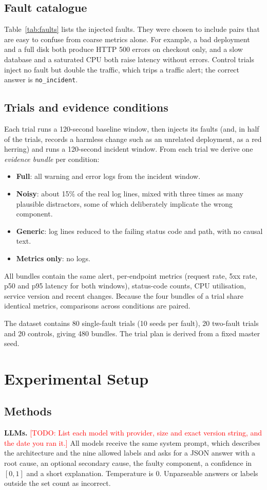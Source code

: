 \documentclass[conference]{IEEEtran}
\newcommand{\TODO}[1]{\textcolor{red}{[TODO: #1]}}
\begin{document}
\subsection{Fault catalogue}
Table~\ref{tab:faults} lists the injected faults. They were chosen to include pairs that are easy to confuse from coarse metrics alone. For example, a bad deployment and a full disk both produce HTTP 500 errors on checkout only, and a slow database and a saturated CPU both raise latency without errors. Control trials inject no fault but double the traffic, which trips a traffic alert; the correct answer is \texttt{no\_incident}.

\subsection{Trials and evidence conditions}
Each trial runs a 120-second baseline window, then injects its faults (and, in half of the trials, records a harmless change such as an unrelated deployment, as a red herring) and runs a 120-second incident window. From each trial we derive one \emph{evidence bundle} per condition:
\begin{itemize}
  \item \textbf{Full}: all warning and error logs from the incident window.
  \item \textbf{Noisy}: about 15\% of the real log lines, mixed with three times as many plausible distractors, some of which deliberately implicate the wrong component.
  \item \textbf{Generic}: log lines reduced to the failing status code and path, with no causal text.
  \item \textbf{Metrics only}: no logs.
\end{itemize}
All bundles contain the same alert, per-endpoint metrics (request rate, 5xx rate, p50 and p95 latency for both windows), status-code counts, CPU utilisation, service version and recent changes. Because the four bundles of a trial share identical metrics, comparisons across conditions are paired.

The dataset contains 80 single-fault trials (10 seeds per fault), 20 two-fault trials and 20 controls, giving 480 bundles. The trial plan is derived from a fixed master seed.

\section{Experimental Setup}
\label{sec:setup}
\subsection{Methods}
\textbf{LLMs.} \TODO{List each model with provider, size and exact version string, and the date you ran it.} All models receive the same system prompt, which describes the architecture and the nine allowed labels and asks for a JSON answer with a root cause, an optional secondary cause, the faulty component, a confidence in $[0,1]$ and a short explanation. Temperature is 0. Unparseable answers or labels outside the set count as incorrect.
\end{document}
